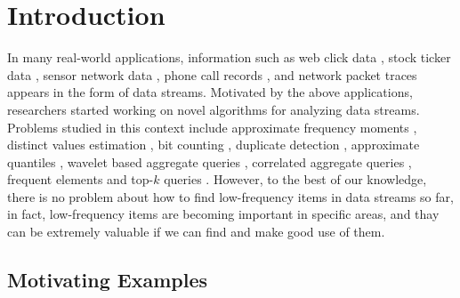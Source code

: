 \documentclass[conference]{IEEEtran}
\begin{document}
\section{Introduction}
In many real-world applications, information such as web click data \cite{IEEEexample:webdata}, stock ticker
data \cite{IEEEexample:stockticker,IEEEexample:stockticker2}, sensor network data \cite{IEEEexample:sensor}, phone call records \cite{IEEEexample:phonecall}, and network packet traces \cite{IEEEexample:packet} appears in the form of data streams. Motivated by the above applications, researchers started working on novel algorithms for analyzing data streams. Problems studied in this context include approximate frequency moments \cite{IEEEexample:frequencymoments}, distinct values estimation \cite{IEEEexample:distinctestimation,IEEEexample:distinctvalues}, bit counting \cite{IEEEexample:bitcounting}, duplicate detection \cite{IEEEexample:sbf,IEEEexample:duplicatedetec}, approximate quantiles \cite{IEEEexample:quantile}, wavelet based aggregate queries \cite{IEEEexample:wavelet}, correlated aggregate queries \cite{IEEEexample:correlated}, frequent elements \cite{IEEEexample:frequent1,IEEEexample:frequent2,IEEEexample:frequent3,IEEEexample:ldsketch} and top-$k$ queries \cite{IEEEexample:spacesaving,IEEEexample:top-k1}. However, to the best of our knowledge, there is no problem about how to find low-frequency items in data streams so far, in fact, low-frequency items are becoming important in specific areas, and thay can be extremely valuable if we can find and make good use of them.

\subsection{Motivating Examples}
\end{document}

